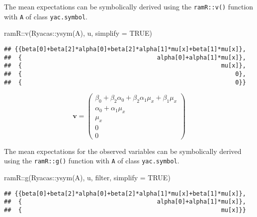 \documentclass[
]{book}
\newenvironment{Shaded}{\begin{snugshade}}{\end{snugshade}}
\newcommand{\AttributeTok}[1]{\textcolor[rgb]{0.77,0.63,0.00}{#1}}
\newcommand{\ConstantTok}[1]{\textcolor[rgb]{0.00,0.00,0.00}{#1}}
\newcommand{\FunctionTok}[1]{\textcolor[rgb]{0.00,0.00,0.00}{#1}}
\newcommand{\NormalTok}[1]{#1}
\newcommand{\SpecialCharTok}[1]{\textcolor[rgb]{0.00,0.00,0.00}{#1}}
\theoremstyle{definition}
\theoremstyle{definition}
\theoremstyle{definition}
\theoremstyle{remark}
\begin{document}
The mean expectations
can be symbolically derived using the \texttt{ramR::v()} function
with \texttt{A} of class \texttt{yac.symbol}.

\begin{Shaded}
\begin{Highlighting}[]
\NormalTok{ramR}\SpecialCharTok{::}\FunctionTok{v}\NormalTok{(Ryacas}\SpecialCharTok{::}\FunctionTok{ysym}\NormalTok{(A), u, }\AttributeTok{simplify =} \ConstantTok{TRUE}\NormalTok{)}
\end{Highlighting}
\end{Shaded}

\begin{verbatim}
## {{beta[0]+beta[2]*alpha[0]+beta[2]*alpha[1]*mu[x]+beta[1]*mu[x]},
##  {                                      alpha[0]+alpha[1]*mu[x]},
##  {                                                        mu[x]},
##  {                                                            0},
##  {                                                            0}}
\end{verbatim}

\begin{equation*}\mathbf{v} =\left( \begin{array}{c} \beta  _{0} + \beta  _{2} \alpha  _{0} + \beta  _{2} \alpha  _{1} \mu  _{x} + \beta  _{1} \mu  _{x} \\ \alpha  _{0} + \alpha  _{1} \mu  _{x} \\ \mu  _{x} \\ 0 \\ 0 \end{array} \right)\end{equation*}

The mean expectations for the observed variables
can be symbolically derived using the \texttt{ramR::g()} function
with \texttt{A} of class \texttt{yac.symbol}.

\begin{Shaded}
\begin{Highlighting}[]
\NormalTok{ramR}\SpecialCharTok{::}\FunctionTok{g}\NormalTok{(Ryacas}\SpecialCharTok{::}\FunctionTok{ysym}\NormalTok{(A), u, filter, }\AttributeTok{simplify =} \ConstantTok{TRUE}\NormalTok{)}
\end{Highlighting}
\end{Shaded}

\begin{verbatim}
## {{beta[0]+beta[2]*alpha[0]+beta[2]*alpha[1]*mu[x]+beta[1]*mu[x]},
##  {                                      alpha[0]+alpha[1]*mu[x]},
##  {                                                        mu[x]}}
\end{verbatim}
\end{document}
